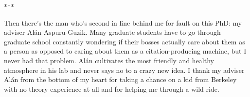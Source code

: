 \begin{center}
   ***
\end{center}


Then there's the man who's second in line behind me for fault on this PhD: my adviser Al\'an Aspuru-Guzik.  Many graduate students have to go through graduate school constantly wondering if their bosses actually care about them as a person as opposed to caring about them as a citation-producing machine, but I never had that problem.  Al\'an cultivates the most friendly and healthy atmosphere in his lab and never says no to a crazy new idea.  I thank my adviser Al\'an from the bottom of my heart for taking a chance on a kid from Berkeley with no theory experience at all and for helping me through a wild ride.
